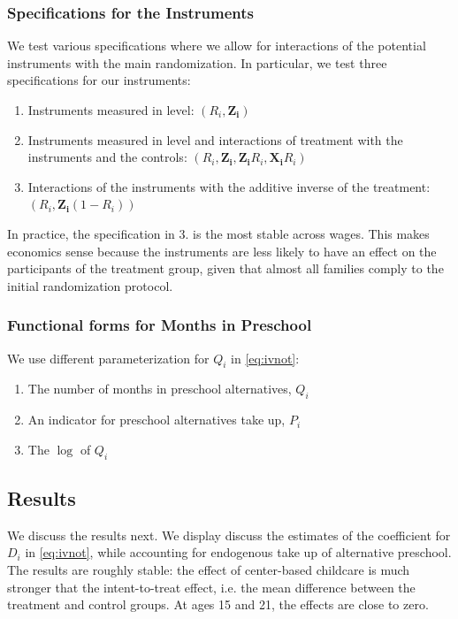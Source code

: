 \begin{appendices}
\subsubsection{Specifications for the Instruments}
\noindent We test various specifications where we allow for interactions of the potential instruments with the main randomization. In particular, we test three specifications for our instruments:

\begin{enumerate}
\item Instruments measured in level: $ \left( R_i,\mathbf{Z_i} \right) $
\item \label{interact} Instruments measured in level and interactions of treatment with the instruments and the controls: $ \left(R_i,\mathbf{Z_i},\mathbf{Z_i}R_i,\mathbf{X_i}R_i \right)$
\item Interactions of the instruments with the additive inverse of the treatment: $\left( R_i,\mathbf{Z_i} \left( 1-R_i \right) \right)$
\end{enumerate}

\noindent In practice, the specification in 3. is the most stable across wages. This makes economics sense because the instruments are less likely to have an effect on the participants of the treatment group, given that almost all families comply to the initial randomization protocol.

\subsubsection{Functional forms for Months in Preschool}

\noindent We use different parameterization for $Q_{i}$ in \eqref{eq:ivnot}: 

\begin{enumerate}
\item The number of months in preschool alternatives, $Q_{i}$
\item An indicator for preschool alternatives take up, $P_i$
\item The $\log$ of $Q_{i}$
\end{enumerate}

\subsection{Results}

\noindent We discuss the results next. We display discuss the estimates of the coefficient for $D_{i}$ in \eqref{eq:ivnot}, while accounting for endogenous take up of alternative preschool. The results are roughly stable: the effect of center-based childcare is much stronger that the intent-to-treat effect, i.e. the mean difference between the treatment and control groups. At ages 15 and 21, the effects are close to zero.


\end{appendices}
